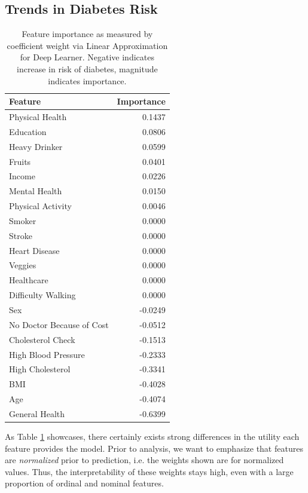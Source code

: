 \documentclass[conference]{IEEEtran}
\begin{document}
    \subsection{Trends in Diabetes Risk}
    \begin{table}[h!]
        \centering
        \caption{Feature importance as measured by coefficient weight via Linear Approximation for Deep Learner. Negative indicates increase in risk of diabetes, magnitude indicates importance.}
        \label{tab:feature_importance}
        \begin{tabular}{l r}
            \toprule
            \textbf{Feature} & \textbf{Importance} \\
            \midrule
            Physical Health & 0.1437 \\
            Education & 0.0806 \\
            Heavy Drinker & 0.0599 \\
            Fruits & 0.0401 \\
            Income & 0.0226 \\
            Mental Health & 0.0150 \\
            Physical Activity & 0.0046 \\
            Smoker & 0.0000 \\
            Stroke & 0.0000 \\
            Heart Disease & 0.0000 \\
            Veggies & 0.0000 \\
            Healthcare & 0.0000 \\
            Difficulty Walking & 0.0000 \\
            Sex & -0.0249 \\
            No Doctor Because of Cost & -0.0512 \\
            Cholesterol Check & -0.1513 \\
            High Blood Pressure & -0.2333 \\
            High Cholesterol & -0.3341 \\
            BMI & -0.4028 \\
            Age & -0.4074 \\
            General Health & -0.6399 \\
            \bottomrule
        \end{tabular}
    \end{table}

    As Table \ref{tab:feature_importance} showcases, there certainly exists strong differences in the utility each feature provides the model. Prior to analysis, we want to emphasize that features are \textit{normalized} prior to prediction, i.e. the weights shown are for normalized values. Thus, the interpretability of these weights stays high, even with a large proportion of ordinal and nominal features.
    
\end{document}
